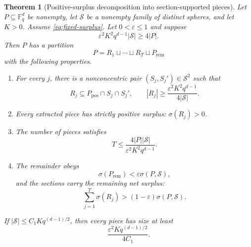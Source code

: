 \documentclass[11pt,letterpaper]{amsart}
\newtheorem{theorem}{Theorem}[section]
\theoremstyle{definition}
\theoremstyle{remark}
\newcommand{\1}{\mathbf 1}
\newcommand{\eps}{\varepsilon}
\begin{document}
\begin{theorem}[Positive-surplus decomposition into section-supported pieces]\label{thm:decomposition}
Let $P\subseteq\mathbb F_q^d$ be nonempty, let $\mathcal S$ be a nonempty family of distinct spheres, and let $K>0$.  Assume \eqref{eq:fixed-surplus}.  Let $0<\eps\le1$ and suppose
\begin{equation}\label{eq:decomp-lower}
 \eps^2K^2q^{d-1}|\mathcal S|\ge4|P|.
\end{equation}
Then $P$ has a partition
\[
 P=R_1\sqcup\cdots\sqcup R_T\sqcup P_{\mathrm{rem}}
\]
with the following properties.
\begin{enumerate}[label=\textup{(\arabic*)}]
\item For every $j$, there is a nonconcentric pair $(S_j,S_j')\in\mathcal S^2$ such that
\begin{equation}\label{eq:piece-containment}
 R_j\subseteq P_{\mathrm{pos}}\cap S_j\cap S_j',
 \qquad
 |R_j|\ge
 \frac{\eps^2K^2q^{d-1}}{4|\mathcal S|}.
\end{equation}
\item Every extracted piece has strictly positive surplus: $\sigma(R_j)>0$.
\item The number of pieces satisfies
\[
 T\le\frac{4|P||\mathcal S|}{\eps^2K^2q^{d-1}}.
\]
\item The remainder obeys
\[
 \sigma(P_{\mathrm{rem}})<\eps\sigma(P,\mathcal S),
\]
and the sections carry the remaining net surplus:
\[
 \sum_{j=1}^T\sigma(R_j)>(1-\eps)\sigma(P,\mathcal S).
\]
\end{enumerate}
If $|\mathcal S|\le C_1Kq^{(d-1)/2}$, then every piece has size at least
\[
 \frac{\eps^2Kq^{(d-1)/2}}{4C_1}.
\]
\end{theorem}
\end{document}
